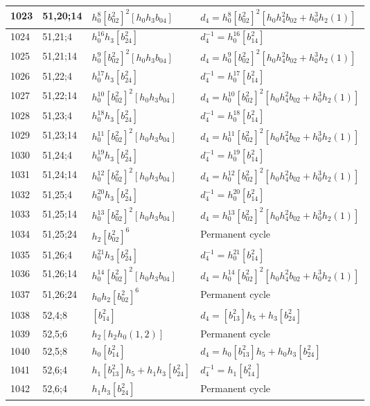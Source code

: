 \documentclass{article}
\begin{document}
\begin{longtable}{|l|l|>{\raggedright\arraybackslash}p{6cm}|>{\raggedright\arraybackslash}p{6cm}|}
\hline
1023 & 51,20;14 & $h_0^8[b_{02}^2]^2[h_0h_3b_{04}]$ &$d_{4}=h_0^8[b_{02}^2]^2[h_0h_4^2b_{02} + h_0^3h_2(1)]$\\
\hline
1024 & 51,21;4 & $h_0^{16}h_3[b_{24}^2]$ & $d_{4}^{-1}=h_0^{16}[b_{14}^2]$\\
\hline
1025 & 51,21;14 & $h_0^9[b_{02}^2]^2[h_0h_3b_{04}]$ &$d_{4}=h_0^9[b_{02}^2]^2[h_0h_4^2b_{02} + h_0^3h_2(1)]$\\
\hline
1026 & 51,22;4 & $h_0^{17}h_3[b_{24}^2]$ & $d_{4}^{-1}=h_0^{17}[b_{14}^2]$\\
\hline
1027 & 51,22;14 & $h_0^{10}[b_{02}^2]^2[h_0h_3b_{04}]$ &$d_{4}=h_0^{10}[b_{02}^2]^2[h_0h_4^2b_{02} + h_0^3h_2(1)]$\\
\hline
1028 & 51,23;4 & $h_0^{18}h_3[b_{24}^2]$ & $d_{4}^{-1}=h_0^{18}[b_{14}^2]$\\
\hline
1029 & 51,23;14 & $h_0^{11}[b_{02}^2]^2[h_0h_3b_{04}]$ &$d_{4}=h_0^{11}[b_{02}^2]^2[h_0h_4^2b_{02} + h_0^3h_2(1)]$\\
\hline
1030 & 51,24;4 & $h_0^{19}h_3[b_{24}^2]$ & $d_{4}^{-1}=h_0^{19}[b_{14}^2]$\\
\hline
1031 & 51,24;14 & $h_0^{12}[b_{02}^2]^2[h_0h_3b_{04}]$ &$d_{4}=h_0^{12}[b_{02}^2]^2[h_0h_4^2b_{02} + h_0^3h_2(1)]$\\
\hline
1032 & 51,25;4 & $h_0^{20}h_3[b_{24}^2]$ & $d_{4}^{-1}=h_0^{20}[b_{14}^2]$\\
\hline
1033 & 51,25;14 & $h_0^{13}[b_{02}^2]^2[h_0h_3b_{04}]$ &$d_{4}=h_0^{13}[b_{02}^2]^2[h_0h_4^2b_{02} + h_0^3h_2(1)]$\\
\hline
1034 & 51,25;24 & $h_2[b_{02}^2]^6$ & Permanent cycle\\
\hline
1035 & 51,26;4 & $h_0^{21}h_3[b_{24}^2]$ & $d_{4}^{-1}=h_0^{21}[b_{14}^2]$\\
\hline
1036 & 51,26;14 & $h_0^{14}[b_{02}^2]^2[h_0h_3b_{04}]$ &$d_{4}=h_0^{14}[b_{02}^2]^2[h_0h_4^2b_{02} + h_0^3h_2(1)]$\\
\hline
1037 & 51,26;24 & $h_0h_2[b_{02}^2]^6$ & Permanent cycle\\
\hline
1038 & 52,4;8 & $[b_{14}^2]$ &$d_{4}=[b_{13}^2]h_5 + h_3[b_{24}^2]$\\
\hline
1039 & 52,5;6 & $h_2[h_2h_0(1, 2)]$ & Permanent cycle\\
\hline
1040 & 52,5;8 & $h_0[b_{14}^2]$ &$d_{4}=h_0[b_{13}^2]h_5 + h_0h_3[b_{24}^2]$\\
\hline
1041 & 52,6;4 & $h_1[b_{13}^2]h_5 + h_1h_3[b_{24}^2]$ & $d_{4}^{-1}=h_1[b_{14}^2]$\\
1042 & 52,6;4 & $h_1h_3[b_{24}^2]$ & Permanent cycle\\

\end{longtable}
\end{document}
